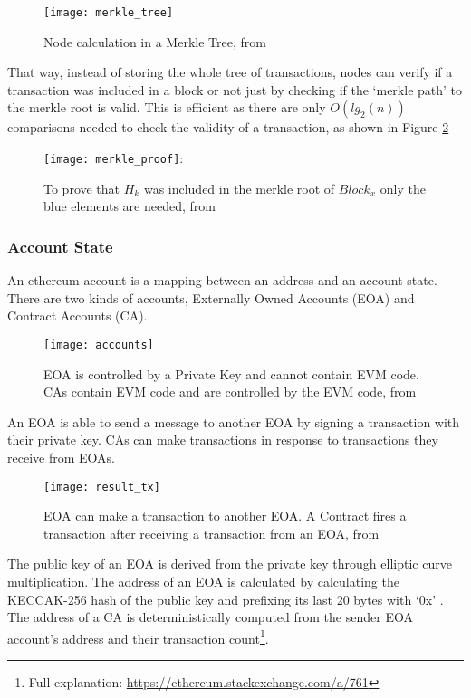 \begin{figure}[H]
    \centering
    \texttt{[image: merkle\_tree]}
    \caption{Node calculation in a Merkle Tree, from \cite{smartproperty}}
    \label{fig:merkletree}
\end{figure}

That way, instead of storing the whole tree of transactions, nodes can verify if a transaction was included in a block or not just by checking if the `merkle path' to the merkle root is valid. This is efficient as there are only $O(lg_{2}(n))$ comparisons needed to check the validity of a transaction, as shown in Figure \ref{fig:merkleproof}

\begin{figure}[H]
    \centering
    \texttt{[image: merkle\_proof]}:
    \caption{To prove that $H_{k}$ was included in the merkle root of $Block_{x}$ only the blue elements are needed, from \cite{smartproperty}}
    \label{fig:merkleproof}
\end{figure}

\subsubsection{Account State}
An ethereum account is a mapping between an address and an account state. There are two kinds of accounts, Externally Owned Accounts (EOA) and Contract Accounts (CA).

\begin{figure}[H]
    \centering
    \texttt{[image: accounts]}
    \caption{EOA is controlled by a Private Key and cannot contain EVM code. CAs contain EVM code and are controlled by the EVM code, from \cite{visual}}
    \label{fig:accounts}
\end{figure}

An EOA is able to send a message to another EOA by signing a transaction with their private key. CAs can make transactions in response to transactions they receive from EOAs. 

\begin{figure}[H]
    \centering
    \texttt{[image: result\_tx]}
    \caption{EOA can make a transaction to another EOA. A Contract fires a transaction after receiving a transaction from an EOA, from \cite{preethi}}
    \label{fig:tx_accounts}
\end{figure}

The public key of an EOA is derived from the private key through elliptic curve multiplication. The address of an EOA is calculated by calculating the KECCAK-256 hash of the public key and prefixing its last 20 bytes with `0x' \cite{ethereum}. The address of a CA is deterministically computed from the sender EOA account's address and their transaction count\footnote{Full explanation: \url{https://ethereum.stackexchange.com/a/761}}.

